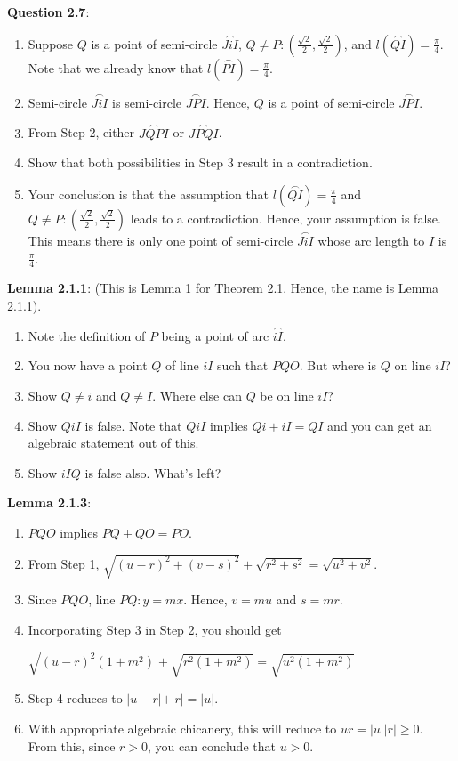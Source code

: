 \documentclass[english]{book}
\newcommand{\arc}[1]{\overset{\frown}{#1} }
\begin{document}
\textbf{Question 2.7}:
\begin{enumerate}[\hspace{1cm}1)]
  \item Suppose $Q$ is a point of semi-circle $\arc{JiI}$, $Q \neq P:(\frac{\sqrt{2}}{2}, \frac{\sqrt{2}}{2})$, and $l(\arc{QI}) = \frac{\pi}{4}$. Note that we already know that $l(\arc{PI}) = \frac{\pi}{4}$.
  \item Semi-circle $\arc{JiI}$ is semi-circle $\arc{JPI}$. Hence, $Q$ is a point of semi-circle $\arc{JPI}$.
  \item From Step 2, either $\arc{JQPI}$ or $\arc{JPQI}$.
  \item Show that both possibilities in Step 3 result in a contradiction.
  \item Your conclusion is that the assumption that $l(\arc{QI}) = \frac{\pi}{4}$ and $Q \neq P:(\frac{\sqrt{2}}{2}, \frac{\sqrt{2}}{2})$ leads to a contradiction. Hence, your assumption is false. This means there is only one point of semi-circle $\arc{JiI}$ whose arc length to $I$ is $\frac{\pi}{4}$.
\end{enumerate}

\textbf{Lemma 2.1.1}: (This is Lemma 1 for Theorem 2.1. Hence, the name is Lemma 2.1.1).
\begin{enumerate}[\hspace{1cm}1)]
  \item Note the definition of $P$ being a point of arc $\arc{iI}$.
  \item You now have a point $Q$ of line $iI$ such that $PQO$. But where is $Q$ on line $iI$?
  \item Show $Q \neq i$ and $Q \neq I$. Where else can $Q$ be on line $iI$?
  \item Show $QiI$ is false. Note that $QiI$ implies $Qi + iI = QI$ and you can get an algebraic statement out of this.
  \item Show $iIQ$ is false also. What's left?
\end{enumerate}

\textbf{Lemma 2.1.3}:
\begin{enumerate}[\hspace{1cm}1)]
  \item $PQO$ implies $PQ + QO = PO$.
  \item From Step 1, $\sqrt{(u-r)^{2} + (v-s)^{2}} + \sqrt{r^{2} + s^{2}} = \sqrt{u^{2} + v^{2}}$.
  \item Since $PQO$, line $PQ: y = mx$. Hence, $v = mu$ and $s = mr$.
  \item Incorporating Step 3 in Step 2, you should get 

      $\sqrt{(u-r)^{2}(1+m^{2})} + \sqrt{r^{2}(1+m^{2})} = \sqrt{u^{2}(1+m^{2})}$
  \item Step 4 reduces to $\vert u-r \vert  +  \vert r \vert  =  \vert u \vert$.
  \item With appropriate algebraic chicanery, this will reduce to $ur = \vert u \vert  \vert r \vert  \geq  0$. From this, since $r>0$, you can conclude that $u>0$.
\end{enumerate}
\end{document}
